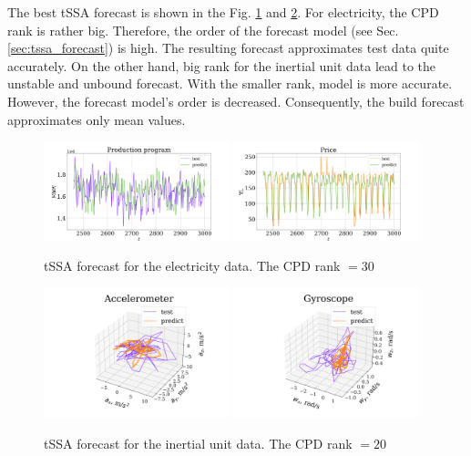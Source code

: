 \documentclass[referee, pdflatex, sn-mathphys-num]{sn-jnl}
\theoremstyle{definition}
\theoremstyle{plain}
\begin{document}
	The best tSSA forecast is shown in the Fig. \ref{fig:tssa_electr_pred} and \ref{fig:tssa_motion_pred}. For electricity, the CPD rank is rather big. Therefore, the order of the forecast model (see Sec. \ref{sec:tssa_forecast}) is high. The resulting forecast approximates test data quite accurately. On the other hand, big rank for the inertial unit data lead to the unstable and unbound forecast. With the smaller rank, model is more accurate. However, the forecast model's order is decreased. Consequently, the build forecast approximates only mean values.
	
	\begin{figure}[h]
		\centering
		\includegraphics[width=0.48\textwidth, keepaspectratio]{Production_program_pred.png}
		\includegraphics[width=0.48\textwidth, keepaspectratio]{Price_pred.png}
		\caption{tSSA forecast for the electricity data. The CPD rank $ = 30 $}\label{fig:tssa_electr_pred}
	\end{figure}
	
	\begin{figure}[h]
		\centering
		\includegraphics[width=0.48\textwidth, keepaspectratio]{acceler_pred.png}
		\includegraphics[width=0.48\textwidth, keepaspectratio]{gyro_pred.png}
		\caption{tSSA forecast for the inertial unit data. The CPD rank $ = 20 $}\label{fig:tssa_motion_pred}
	\end{figure}
	
\end{document}
